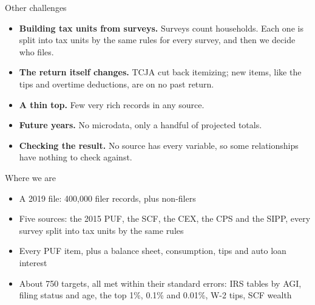 \documentclass[11pt,aspectratio=169]{beamer}
\begin{document}
\begin{frame}{Other challenges}
  \begin{itemize}
    \item \textbf{Building tax units from surveys.} Surveys count households. Each one is split
          into tax units by the same rules for every survey, and then we decide who files.
    \vspace{0.5em}
    \item \textbf{The return itself changes.} TCJA cut back itemizing; new items, like the
          tips and overtime deductions, are on no past return.
    \vspace{0.5em}
    \item \textbf{A thin top.} Few very rich records in any source.
    \vspace{0.5em}
    \item \textbf{Future years.} No microdata, only a handful of projected totals.
    \vspace{0.5em}
    \item \textbf{Checking the result.} No source has every variable, so some relationships
          have nothing to check against.
  \end{itemize}
\end{frame}


\begin{frame}{Where we are}
  \begin{itemize}
    \item A 2019 file: 400,000 filer records, plus non-filers
    \vspace{0.4em}
    \item Five sources: the 2015 PUF, the SCF, the CEX, the CPS and the SIPP, every survey
          split into tax units by the same rules
    \vspace{0.4em}
    \item Every PUF item, plus a balance sheet, consumption, tips and auto loan interest
    \vspace{0.4em}
    \item About 750 targets, all met within their standard errors: IRS tables by AGI,
          filing status and age, the top 1\%, 0.1\% and 0.01\%, W-2 tips, SCF wealth
  \end{itemize}
\end{frame}
\end{document}
